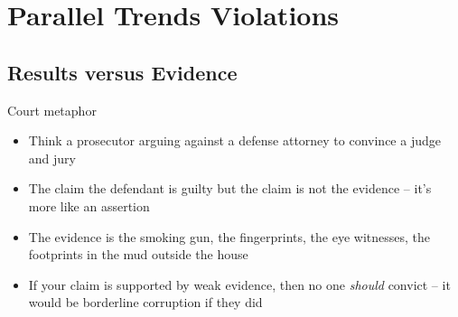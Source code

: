 \documentclass{beamer}
\begin{document}
  
  






\section{Parallel Trends Violations}

\subsection{Results versus Evidence}

\begin{frame}{Court metaphor}

	\begin{itemize}
	\item Think a prosecutor arguing against a defense attorney to convince a judge and jury
	\item The claim the defendant is guilty but the claim is not the evidence -- it's more like an assertion
	\item The evidence is the smoking gun, the fingerprints, the eye witnesses, the footprints in the mud outside the house
	\item If your claim is supported by weak evidence, then no one \emph{should} convict -- it would be borderline corruption if they did 
	\end{itemize}

\end{frame}
\end{document}
